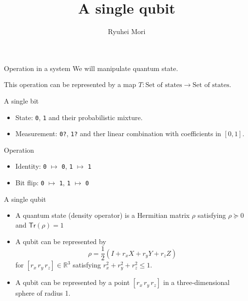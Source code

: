 \documentclass{beamer}
\title{A single qubit}
\author{Ryuhei Mori}
\institute{Tokyo Institute of Technology}
\newcommand{\Tr}{\mathsf{Tr}}
\begin{document}
\begin{frame}[plain]
\maketitle
\end{frame}

\begin{frame}{Operation in a system}
We will manipulate quantum state.

\vspace{2em}
This operation can be represented by a map $T: \text{Set of states} \to \text{Set of states}$.

\vspace{2em}
\end{frame}

\begin{frame}{A single bit}
\begin{itemize}
\setlength{\itemsep}{3em}
\item State: \texttt{0},  \texttt{1} and their probabilistic mixture.
\item Measurement: \texttt{0?}, \texttt{1?} and ther linear combination with coefficients in $[0,1]$.
\end{itemize}

Operation
\begin{itemize}
\item Identity: \texttt{0} $\mapsto$ \texttt{0}, \texttt{1} $\mapsto$ \texttt{1}
\item Bit flip: \texttt{0} $\mapsto$ \texttt{1}, \texttt{1} $\mapsto$ \texttt{0}
\end{itemize}
\end{frame}

\begin{frame}{A single qubit}
\begin{itemize}
\setlength{\itemsep}{3em}
\item A quantum state (density operator) is a Hermitian matrix $\rho$ satisfying $\rho\succeq0$ and $\Tr(\rho)=1$
\item A qubit can be represented by
\begin{equation*}
\rho = \frac12\left(I + r_x X + r_y Y + r_z Z\right)
\end{equation*}
for $[r_x\, r_y\, r_z]\in\mathbb{R}^3$ satisfying $r_x^2+r_y^2+r_z^2\le 1$.
\item A qubit can be represented by a point $[r_x\,r_y\,r_z]$ in a three-dimensional sphere of radius 1.
\end{itemize}
\end{frame}
\end{document}
